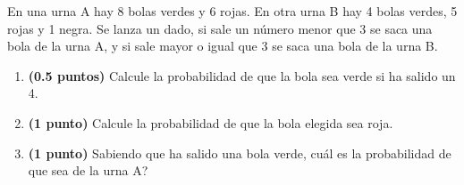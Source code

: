 
En una urna A hay 8 bolas verdes y 6 rojas. En otra urna B hay 4 bolas verdes, 5 rojas y 1 negra. Se lanza un dado, si sale un número menor que 3 se saca una bola de la urna A, y si sale mayor o igual que 3 se saca una bola de la urna B.
\begin{enumerate}[label=\alph*)]
\item \textbf{(0.5 puntos)} Calcule la probabilidad de que la bola sea verde si ha salido un 4.
\item \textbf{(1 punto)} Calcule la probabilidad de que la bola elegida sea roja.
\item \textbf{(1 punto)} Sabiendo que ha salido una bola verde, \textquestiondown{}cuál es la probabilidad de que sea de la urna A?
\end{enumerate}
